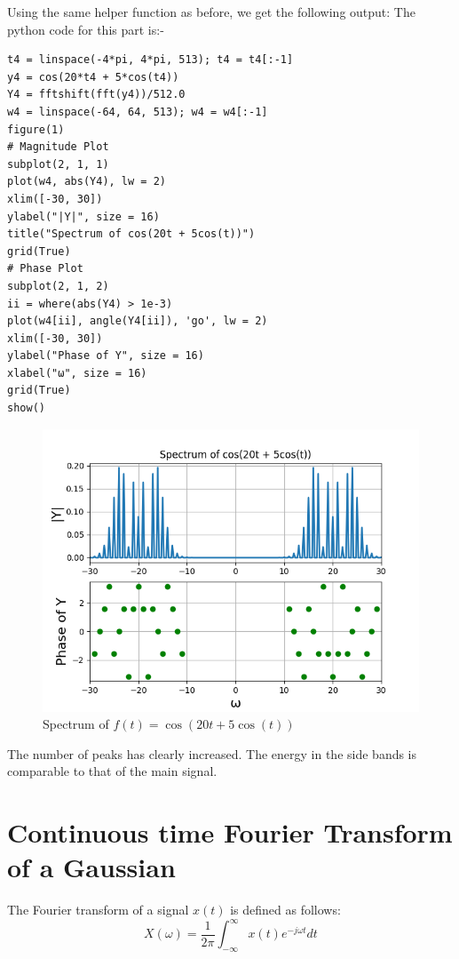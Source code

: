 \documentclass{article}
\begin{document}
Using the same helper function as before, we get the following output:\newline
The python code for this part is:-
\begin{lstlisting}
t4 = linspace(-4*pi, 4*pi, 513); t4 = t4[:-1]
y4 = cos(20*t4 + 5*cos(t4))
Y4 = fftshift(fft(y4))/512.0
w4 = linspace(-64, 64, 513); w4 = w4[:-1]
figure(1)
# Magnitude Plot
subplot(2, 1, 1)
plot(w4, abs(Y4), lw = 2)
xlim([-30, 30])
ylabel("|Y|", size = 16)
title("Spectrum of cos(20t + 5cos(t))")
grid(True)
# Phase Plot
subplot(2, 1, 2)
ii = where(abs(Y4) > 1e-3)
plot(w4[ii], angle(Y4[ii]), 'go', lw = 2)
xlim([-30, 30])
ylabel("Phase of Y", size = 16)
xlabel("ω", size = 16)
grid(True)
show()
\end{lstlisting}
\begin{figure}[h!]
\centering
\includegraphics[scale=0.6]{Ass8_Figure_7.png}
\caption{Spectrum of $f(t) = \cos(20t + 5\cos(t))$}
\label{fig:universe}
\end{figure}


The number of peaks has clearly increased. The energy in the side bands is comparable to that of the main signal.



\section{Continuous time Fourier Transform of a Gaussian}
		
The Fourier transform of a signal $x(t)$ is defined as follows:\newline
\begin{equation}
X(\omega) = \frac{1}{2 \pi} \int_{- \infty}^{\infty} x(t) e^{-j \omega t} dt    
\end{equation}
\end{document}
